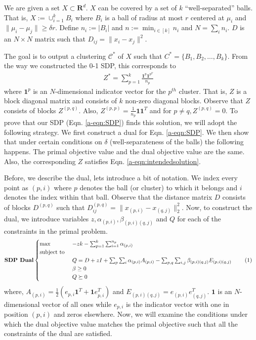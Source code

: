 \documentclass[12pt]{article}
\newcommand{\mc}{\mathcal}
\newcommand{\mb}{\mathbf}
\newcommand\numberthis{\addtocounter{equation}{1}\tag{\theequation}}
\begin{document}
We are given a set $X \subset \mb R^d$. $X$ can be covered by a set of $k$ ``well-separated'' balls. That is, $X := \cup_{i=1}^k B_i$ where $B_i$ is a ball of radius at most $r$ centered at $\mu_i$ and $\|\mu_i - \mu_j\| \ge \delta r$. %
Define $n_i := |B_i|$ and $n := \min_{i\in[k]} n_i$ and $N = \sum_i n_i$. $D$ is an $N\times N$ matrix such that $D_{ij} = \|x_i -x_j\|^2$.  

The goal is to output a clustering $\mc C^*$ of $X$ such that $C^* = \{B_1, B_2, \ldots, B_k\}$. From the way we constructed the 0-1 SDP, this corresponds to
\begin{align}
  Z^* = \sum_{p=1}^k \frac{\mb 1^p \mb 1^{p^T}}{n_p} \label{a-eqn:intendedsolution}
\end{align}
where $\mb 1^p$ is an $N$-dimensional indicator vector for the $p^{th}$ cluster. That is, $Z$ is a block diagonal matrix and consists of $k$ non-zero diagonal blocks. Observe that $Z$ consists of blocks $Z^{(p, q)}$. Also, $Z^{(p, p)} = \frac{1}{n_p}\mb 1\mb 1^T$ and for $p \neq q, Z^{(p, q)} = 0$. To prove that our SDP (Eqn. \ref{a-eqn:SDP}) finds this solution, we  will adopt the following strategy. We first construct a dual for Eqn. \ref{a-eqn:SDP}. We then show that under certain conditions on $\delta$ (well-separateness of the balls) the following happens. The primal objective value and the dual objective value are the same. Also, the corresponding $Z$ satisfies Eqn. \ref{a-eqn:intendedsolution}. 

Before, we describe the dual, lets introduce a bit of notation. We index every point as $(p, i)$ where $p$ denotes the ball (or cluster) to which it belongs and $i$ denotes the index within that ball. Observe that the distance matrix $D$ consists of blocks $D^{(p, q)}$ such that $D^{(p,q)}_{ij} = \|x_{(p,i)}-x_{(q,j)}\|^2_2$. Now, to construct the dual, we introduce variables $z, \alpha_{(p,i)}, \beta_{(p,i)(q,j)}$ and $Q$ for each of the constraints in the primal problem. 
\[\textbf{SDP Dual}
    \begin{cases}
		\max \enspace &-zk - \sum_{p=1}^{k}\sum_{i=1}^{n_p} \alpha_{(p,i)}\\
		\text{subject to } \\
		&Q = D + zI + \sum_p\sum_i \alpha_{(p,i)}A_{(p, i)} -\sum_{p,q}\sum_{i,j} \beta_{(p,i)(q,j)}E_{(p,i)(q,j)}\\
		&\beta \ge 0 \\
		&Q \succeq 0
	\end{cases}
	\label{a-eqn:SDPDual}
	\numberthis
\]
where, $A_{(p,i)} = \frac{1}{2}(e_{p,i}\mb 1^T + \mb 1 e_{p, i}^T)$ and $E_{(p,i)(q,j)} = e_{(p,i)}e_{(q,j)}^T$. $\mb 1$ is an $N$-dimensional vector of all ones while $e_{p,i}$ is the indicator vector with one in position $(p, i)$ and zeros elsewhere. Now, we will examine the conditions under which the dual objective value matches the primal objective such that all the constraints of the dual are satisfied. 
\end{document}

